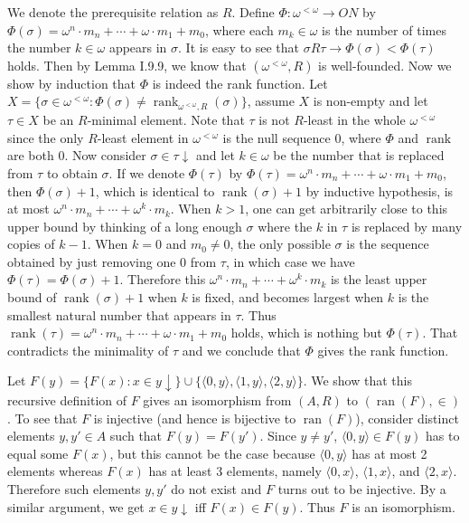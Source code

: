 \documentclass[12pt]{article}
\newcommand{\ran}{\mathop{\mathrm{ran}}}
\newcommand{\rank}{\mathop{\mathrm{rank}}}
\theoremstyle{definition}
\newenvironment{customthm}[1]
  {\renewcommand\theinnercustomthm{#1}\innercustomthm}
  {\endinnercustomthm}
\begin{document}
\begin{customthm}{I.9.48}
  We denote the prerequisite relation as $R$. Define $\Phi:\omega^{<\omega}\rightarrow ON$ by $\Phi(\sigma)=\omega^n\cdot m_n+\cdots+\omega\cdot m_1+m_0$, where each $m_k\in\omega$ is the number of times the number $k\in\omega$ appears in $\sigma$. It is easy to see that $\sigma R\tau\rightarrow\Phi(\sigma)<\Phi(\tau)$ holds. Then by Lemma I.9.9, we know that $(\omega^{<\omega},R)$ is well-founded. Now we show by induction that $\Phi$ is indeed the rank function. Let $X=\{\sigma\in\omega^{<\omega}:\Phi(\sigma)\neq\rank_{\omega^{<\omega},R}(\sigma)\}$, assume $X$ is non-empty and let $\tau\in X$ be an $R$-minimal element. Note that $\tau$ is not $R$-least in the whole $\omega^{<\omega}$ since the only $R$-least element in $\omega^{<\omega}$ is the null sequence $0$, where $\Phi$ and $\rank$ are both $0$. Now consider $\sigma\in\tau\downarrow$ and let $k\in\omega$ be the number that is replaced from $\tau$ to obtain $\sigma$. If we denote $\Phi(\tau)$ by $\Phi(\tau)=\omega^n\cdot m_n+\cdots+\omega\cdot m_1+m_0$, then $\Phi(\sigma)+1$, which is identical to $\rank(\sigma)+1$ by inductive hypothesis, is at most $\omega^n\cdot m_n+\cdots+\omega^{k}\cdot m_k$. When $k>1$, one can get arbitrarily close to this upper bound by thinking of a long enough $\sigma$ where the $k$ in $\tau$ is replaced by many copies of $k-1$. When $k=0$ and $m_0\neq 0$, the only possible $\sigma$ is the sequence obtained by just removing one $0$ from $\tau$, in which case we have $\Phi(\tau)=\Phi(\sigma)+1$. Therefore this $\omega^n\cdot m_n+\cdots+\omega^{k}\cdot m_k$ is the least upper bound of $\rank(\sigma)+1$ when $k$ is fixed, and becomes largest when $k$ is the smallest natural number that appears in $\tau$. Thus $\rank(\tau)=\omega^n\cdot m_n+\cdots+\omega\cdot m_1+m_0$ holds, which is nothing but $\Phi(\tau)$. That contradicts the minimality of $\tau$ and we conclude that $\Phi$ gives the rank function.
\end{customthm}

\begin{customthm}{I.9.49}
  Let $F(y)=\{F(x):x\in y\downarrow\}\cup\{\langle 0,y\rangle,\langle 1,y\rangle,\langle 2,y\rangle\}$. We show that this recursive definition of $F$ gives an isomorphism from $(A,R)$ to $(\ran(F),\in)$. To see that $F$ is injective (and hence is bijective to $\ran(F)$), consider distinct elements $y,y'\in A$ such that $F(y)=F(y')$. Since $y\neq y'$, $\langle0,y\rangle\in F(y)$ has to equal some $F(x)$, but this cannot be the case because $\langle0,y\rangle$ has at most 2 elements whereas $F(x)$ has at least 3 elements, namely $\langle 0,x\rangle$, $\langle 1,x\rangle$, and $\langle 2,x\rangle$. Therefore such elements $y,y'$ do not exist and $F$ turns out to be injective. By a similar argument, we get $x\in y\downarrow$ iff $F(x)\in F(y)$. Thus $F$ is an isomorphism.
\end{customthm}
\end{document}
